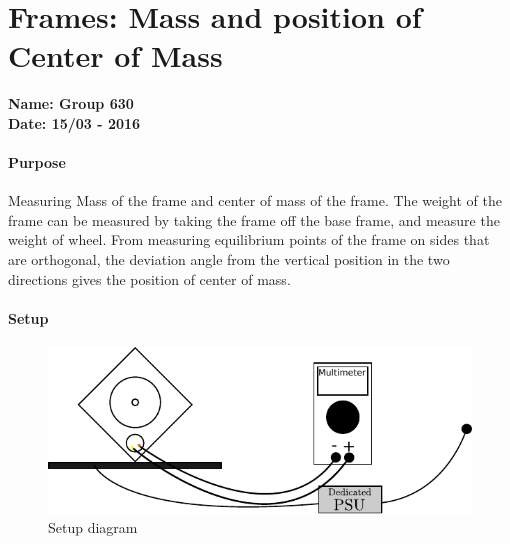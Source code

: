 \chapter{Frames: Mass and position of Center of Mass }\label{MassFrameCenterOfMass} 
\textbf{Name: Group 630}\\
\textbf{Date: 15/03 - 2016}

\subsubsection{Purpose}
Measuring Mass of the frame and center of mass of the frame.
The weight of the frame can be measured by taking the frame off the base frame, and measure the weight of wheel. 
From measuring equilibrium points of the frame on sides that are orthogonal, the deviation angle from the vertical position in the two directions gives the position of center of mass.

\subsubsection{Setup}
\begin{figure}[H]
	\centering
	\includegraphics[scale=1]{figures/LabSetupLinearityTest.pdf}
	\caption{Setup diagram}
	\label{LabSetupRangeTest}
\end{figure}\vspace{-5mm}
